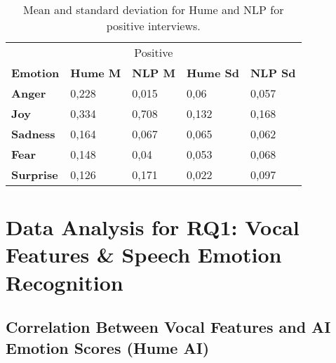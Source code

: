 \begin{table}[H]
    \centering
    \begin{tabular}{lllll}
    \multicolumn{5}{c}{\cellcolor[HTML]{BFBFBF}Positive}                                                                                                                                           \\
    \multicolumn{1}{l|}{\textbf{Emotion}}  & \multicolumn{1}{c}{\textbf{Hume M}} & \multicolumn{1}{c}{\textbf{NLP M}} & \multicolumn{1}{c}{\textbf{Hume Sd}} & \multicolumn{1}{c}{\textbf{NLP Sd}} \\ \hline
    \multicolumn{1}{l|}{\textbf{Anger}}    & 0,228                               & 0,015                              & 0,06                                 & 0,057                               \\
    \multicolumn{1}{l|}{\textbf{Joy}}      & 0,334                               & 0,708                              & 0,132                                & 0,168                               \\
    \multicolumn{1}{l|}{\textbf{Sadness}}  & 0,164                               & 0,067                              & 0,065                                & 0,062                               \\
    \multicolumn{1}{l|}{\textbf{Fear}}     & 0,148                               & 0,04                               & 0,053                                & 0,068                               \\
    \multicolumn{1}{l|}{\textbf{Surprise}} & 0,126                               & 0,171                              & 0,022                                & 0,097                              
    \end{tabular}
    \caption{Mean and standard deviation for Hume and NLP for positive interviews.}
    \label{tab:summery_hume_nlp_pos}
\end{table}

\section{Data Analysis for RQ1: Vocal Features \& Speech Emotion Recognition}

\subsection{Correlation Between Vocal Features and AI Emotion Scores (Hume AI)}

